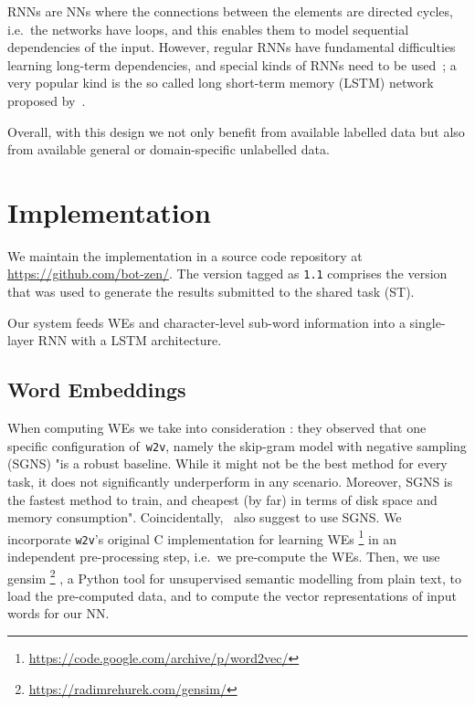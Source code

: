 \documentclass[11pt]{article}
\newcommand\wtv{\texttt{w2v}\xspace}
\begin{document}
RNNs are NNs where the connections between the elements are directed cycles,
i.e.~the networks have loops, and this enables them to model sequential
dependencies of the input.
However, regular RNNs have fundamental difficulties learning long-term
dependencies, and special kinds of RNNs need to be used~\cite{Hochreiter1991}; 
a very popular kind is the so called long short-term memory (LSTM)
network proposed by~.

Overall, with this design we not only benefit from available labelled data but
also from available general or domain-specific unlabelled data.

\section{Implementation} %
\label{sec:implementation}

We maintain the implementation in a source code repository at
\url{https://github.com/bot-zen/}.  
The version tagged as {\tt 1.1} comprises the version that was used to generate
the results submitted to the shared task (ST).

Our system feeds WEs and character-level sub-word information into a
single-layer RNN with a LSTM architecture.


\subsection{Word Embeddings} %

When computing WEs we take into consideration : they observed
that one specific configuration of~\wtv, namely the skip-gram model with
negative sampling (SGNS) 
"is a robust baseline.  While it might not be the best method for every task,
it does not significantly underperform in any scenario. Moreover, SGNS is the
fastest method to train, and cheapest (by far) in terms of disk space and
memory consumption".
Coincidentally,~ also suggest to use SGNS.
We incorporate \wtv's original C implementation for learning WEs%
\footnote{\url{https://code.google.com/archive/p/word2vec/}}
in an independent pre-processing step, i.e.~we pre-compute the WEs.
Then, we use gensim%
\footnote{\url{https://radimrehurek.com/gensim/}}%
, a Python tool for unsupervised semantic modelling from plain text, to load
the pre-computed data, and to compute the vector representations of
input words for our NN.
\end{document}
